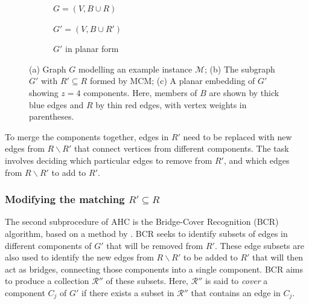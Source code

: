 \documentclass[authoryear]{elsarticle}
\begin{document}
\begin{figure}[H]	
	\centering
	\begin{subfigure}[h]{0.33\textwidth}
		
		\vspace{-2mm}
		\caption{$G = (V, B \cup R)$}
		\label{fig:threshold}
	\end{subfigure} \hspace{5mm}
	\begin{subfigure}[h]{0.33\textwidth}
		
		\vspace{-2mm}
		\caption{$G' = (V, B \cup R')$}
		\label{fig:matching}
	\end{subfigure} \hspace{7mm}
	\begin{subfigure}[h]{0.2\textwidth}
		
		\caption{$G'$ in planar form}
		\label{fig:mps}
	\end{subfigure}
	\caption{(a) Graph $G$ modelling an example instance $\mathcal{M}$; (b) The subgraph $G'$ with $R' \subseteq R$ formed by MCM; (c) A planar embedding of $G'$ showing $z = 4$ components. Here, members of $B$ are shown by thick blue edges and $R$ by thin red edges, with vertex weights in parentheses.}
	\label{fig:mcm}
\end{figure}


\noindent To merge the components together, edges in $R'$ need to be replaced with new edges from $R \backslash R'$ that connect vertices from different components. The task involves deciding which particular edges to remove from $R'$, and which edges from $R \backslash R'$ to add to $R'$.

\subsubsection{Modifying the matching $R' \subseteq R$}
\label{subsub:bcr}
\noindent The second subprocedure of AHC is the Bridge-Cover Recognition (BCR) algorithm, based on a method by \citet{becker2010}. BCR seeks to identify subsets of edges in different components of $G'$ that will be removed from $R'$. These edge subsets are also used to identify the new edges from $R \backslash R'$ to be added to $R'$ that will then act as bridges, connecting those components into a single component. BCR aims to produce a collection $\mathcal{R}''$ of these subsets. Here, $\mathcal{R}''$ is said to \emph{cover} a component $C_j$ of $G'$ if there exists a subset in $\mathcal{R}''$ that contains an edge in $C_j$.
\end{document}
